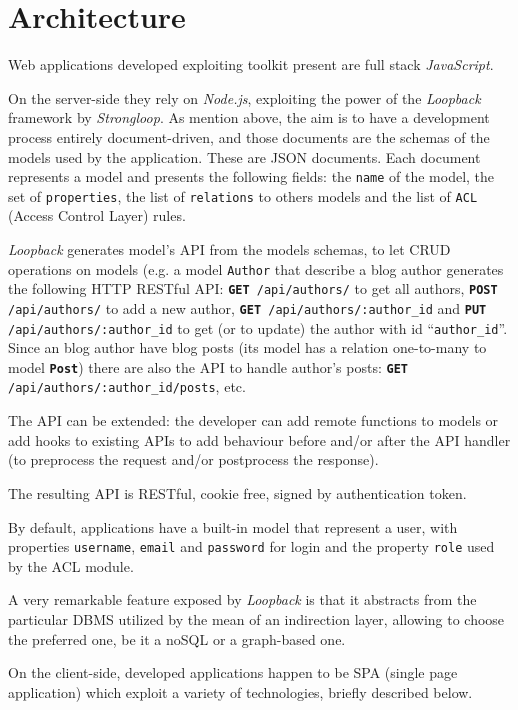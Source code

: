 \section{Architecture}\label{sec:architecture}

Web applications developed exploiting  toolkit present are
full stack {\em JavaScript}.

On the server-side they rely on {\em Node.js}, exploiting the power of the
{\em Loopback} framework by {\em Strongloop}. As mention above, the aim is to
have a development process entirely document-driven, and those documents are
the schemas of the models used by the application. These are JSON documents.
Each document represents a model and presents the following fields: the
\texttt{name} of the model, the set of \texttt{properties}, the list of
\texttt{relations} to others models and the list of \texttt{ACL} (Access
Control Layer) rules.

{\em Loopback} generates model’s API from the models schemas, to let CRUD
operations on models (e.g. a model \texttt{Author} that describe a blog author
generates the following HTTP RESTful API: \texttt{{\bf GET} /api/authors/} to
get all authors, \texttt{{\bf POST} /api/authors/} to add a new author,
\texttt{{\bf GET} /api/authors/:author\_id} and \texttt{{\bf PUT}
/api/authors/:author\_id} to get (or to update) the author with id
``\texttt{author\_id}''.  Since an blog author have blog posts (its model has
a relation one-to-many to model \texttt{{\bf Post}}) there are also the API to
handle author's posts: \texttt{{\bf GET} /api/authors/:author\_id/posts}, etc.

The API can be extended: the developer can add remote functions to models or
add hooks to existing APIs to add behaviour before and/or after the API
handler (to preprocess the request and/or postprocess the response).

The resulting API is RESTful, cookie free, signed by authentication token.

By default, applications have a built-in model that represent a user, with
properties \texttt{username}, \texttt{email} and \texttt{password} for login
and the property \texttt{role} used by the ACL module.

A very remarkable feature exposed by {\em Loopback} is that it abstracts from the particular DBMS utilized by the mean of an indirection layer, allowing to choose the preferred one, be it a noSQL or a graph-based one.


On the client-side, developed applications happen to be SPA (single page
application) which exploit a variety of technologies, briefly described below.

